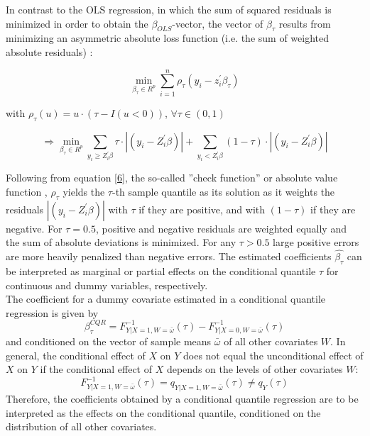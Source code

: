 In contrast to the OLS regression, in which the sum of squared residuals is minimized in order to obtain the $\beta_{OLS}$-vector, the vector of $\beta_{\tau}$ results from minimizing an asymmetric absolute loss function (i.e. the sum of weighted absolute residuals) \citep{Koenker&Bassett:1978}:

\begin{equation}\label{5}
  \min_{\beta_{\tau}\in R^{p}}\sum_{i=1}^n \rho_{\tau}(y_{i}-z_{i}^{'}\beta_{\tau})
\end{equation}
\begin{center}
with $\rho_{\tau}(u)=u\cdot (\tau-I(u<0))$, $\forall \tau \in (0,1)$
\end{center}
\begin{equation}\label{6}
  \Longrightarrow \min_{\beta_{\tau}\in R^{p}}\sum_{y_{i}\geq Z_{i}^{'}\beta}\tau \cdot \left| (y_{i}-Z_{i}^{'}\beta) \right| + \sum_{y_{i} < Z_{i}^{'}\beta}(1-\tau) \cdot \left| (y_{i}-Z_{i}^{'}\beta) \right|
\end{equation}

Following from equation \ref{6}, the so-called ''check function'' or absolute value function \citep{Koenker&Hallock:2001}, $\rho_{\tau}$ yields the $\tau$-th sample quantile as its solution as it weights the residuals $\left| (y_{i}-Z_{i}^{'}\beta) \right|$ with $\tau$ if they are positive, and with $(1-\tau)$ if they are negative. For $\tau=0.5$, positive and negative residuals are weighted equally and the sum of absolute deviations is minimized. For any $\tau > 0.5$ large positive errors are more heavily penalized than negative errors. The estimated coefficients $\hat{\beta_{\tau}}$ can be interpreted as marginal or partial effects on the conditional quantile $\tau$ for continuous and dummy variables, respectively.\\
The coefficient for a dummy covariate estimated in a conditional quantile regression is given by
\begin{equation}\label{7}
  \beta_{\tau}^{CQR}=F_{Y|X=1 , W=\bar{\omega}}^{-1}(\tau) - F_{Y|X=0 , W=\bar{\omega}}^{-1}(\tau)
\end{equation}
and conditioned on the vector of sample means $\bar{\omega}$ of all other covariates $W$. In general, the conditional effect of $X$ on $Y$ does not equal the unconditional effect of $X$ on $Y$ if the conditional effect of $X$ depends on the levels of other covariates $W$:
\begin{equation*}
  F_{Y|X=1 , W=\bar{\omega}}^{-1}(\tau)=q_{Y|X=1 , W=\bar{\omega}}(\tau) \neq q_{Y}(\tau)
\end{equation*}
Therefore, the coefficients obtained by a conditional quantile regression are to be interpreted as the effects on the conditional quantile, conditioned on the distribution of all other covariates.
